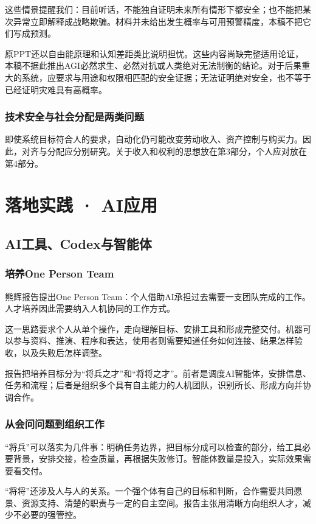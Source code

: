 \documentclass[UTF8,zihao=-4,fontset=fandol,oneside,openany]{ctexbook}
\begin{document}
这些情景提醒我们：目前听话，不能独自证明未来所有情形下都安全；也不能把某次异常立即解释成战略欺骗。材料并未给出发生概率与可用预警精度，本稿不把它们写成预测。

原PPT还以自由能原理和认知差距类比说明担忧。这些内容尚缺完整适用论证，本稿不据此推出AGI必然求生、必然对抗或人类绝对无法制衡的结论。对于后果重大的系统，应要求与用途和权限相匹配的安全证据；无法证明绝对安全，也不等于已经证明灾难具有高概率。

\subsection*{技术安全与社会分配是两类问题}
即使系统目标符合人的要求，自动化仍可能改变劳动收入、资产控制与购买力。因此，对齐与分配应分别研究。关于收入和权利的思想放在第3部分，个人应对放在第4部分。

\chapter{落地实践 · AI应用}
\section{AI工具、Codex与智能体}
\subsection*{培养One Person Team}
熊辉报告提出One Person Team：个人借助AI承担过去需要一支团队完成的工作。人才培养因此需要纳入人机协同的工作方式\cite{xiong}。

这一思路要求个人从单个操作，走向理解目标、安排工具和形成完整交付。机器可以参与资料、推演、程序和表达，使用者则需要知道任务如何连接、结果怎样验收，以及失败后怎样调整。

报告把培养目标分为“将兵之才”和“将将之才”。前者是调度AI智能体，安排信息、任务和流程；后者是组织多个具有自主能力的人机团队，识别所长、形成方向并协调合作。

\subsection*{从会问问题到组织工作}
“将兵”可以落实为几件事：明确任务边界，把目标分成可以检查的部分，给工具必要背景，安排交接，检查质量，再根据失败修订。智能体数量是投入，实际效果需要看交付。

“将将”还涉及人与人的关系。一个强个体有自己的目标和判断，合作需要共同愿景、资源支持、清楚的职责与一定的自主空间。报告主张用清晰方向组织人才，减少不必要的强管控。
\end{document}
